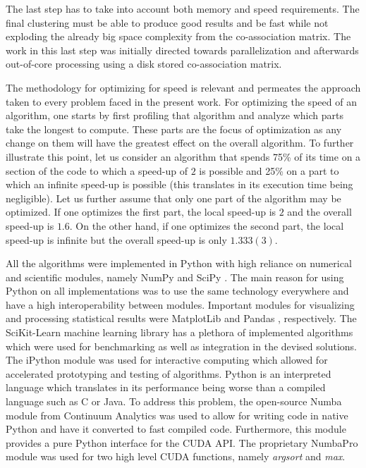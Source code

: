 The last step has to take into account both memory and speed requirements.
The final clustering must be able to produce good results and be fast while not exploding the already big space complexity from the co-association matrix.
The work in this last step was initially directed towards parallelization and afterwards out-of-core processing using a disk stored co-association matrix.%

The methodology for optimizing for speed is relevant and permeates the approach taken to every problem faced in the present work.
For optimizing the speed of an algorithm, one starts by first profiling that algorithm and analyze which parts take the longest to compute.
These parts are the focus of optimization as any change on them will have the greatest effect on the overall algorithm.
To further illustrate this point, let us consider an algorithm that spends 75\% of its time on a section of the code to which a speed-up of $2$ is possible and 25\% on a part to which an infinite speed-up is possible (this translates in its execution time being negligible).
Let us further assume that only one part of the algorithm may be optimized.
If one optimizes the first part, the local speed-up is $2$ and the overall speed-up is $1.6$.
On the other hand, if one optimizes the second part, the local speed-up is infinite but the overall speed-up is only $1.333(3)$.

All the algorithms were implemented in Python with high reliance on numerical and scientific modules, namely NumPy \cite{VanDerWalt2011} and SciPy \cite{JonesSciPy,Oliphant2007,Millman2011}.
The main reason for using Python on all implementations was to use the same technology everywhere and have a high interoperability between modules.
Important modules for visualizing and processing statistical results were MatplotLib \cite{hunter2007matplotlib} and Pandas \cite{McKinney2010}, respectively.
The SciKit-Learn \cite{Pedregosa2011} machine learning library has a plethora of implemented algorithms which were used for benchmarking as well as integration in the devised solutions.
The iPython \cite{Perez2007} module was used for interactive computing which allowed for accelerated prototyping and testing of algorithms.
Python is an interpreted language which translates in its performance being worse than a compiled language such as C or Java.
To address this problem, the open-source Numba \cite{numba} module from Continuum Analytics was used to allow for writing code in native Python and have it converted to fast compiled code.
Furthermore, this module provides a pure Python interface for the CUDA API.
The proprietary NumbaPro module was used for two high level CUDA functions, namely \emph{argsort} and \emph{max}. %



